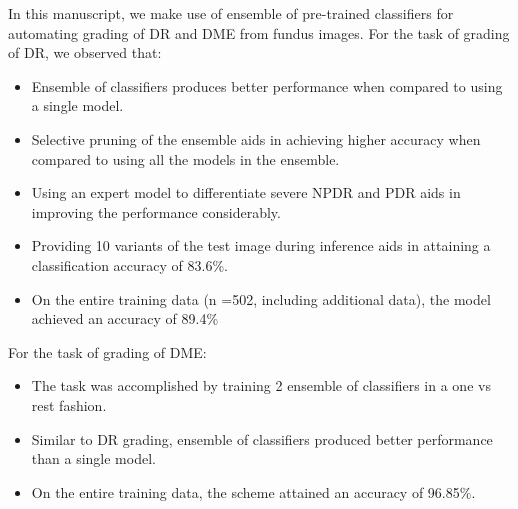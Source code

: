 \documentclass{paper}
\begin{document}
In this manuscript, we make use of ensemble of pre-trained classifiers for automating grading of DR and DME from fundus images. For the task of grading of DR, we observed that:
\begin{itemize}
\item Ensemble of classifiers produces better performance when compared to using a single model.
\item Selective pruning of the ensemble aids in achieving higher accuracy when compared to using all the models in the ensemble.
\item Using an expert model to differentiate severe NPDR and PDR aids in improving the performance considerably.
\item Providing 10 variants of the test image during inference aids in attaining a classification accuracy of 83.6\%.
\item On the entire training data (n =502, including additional data), the model achieved an accuracy of 89.4\%
\end{itemize}
For the task of grading of DME:
\begin{itemize}
\item The task was accomplished by training 2 ensemble of classifiers in a one vs rest fashion.
\item Similar to DR grading, ensemble of classifiers produced better performance than a single model.
\item On the entire training data, the scheme attained an accuracy of 96.85\%.
\end{itemize}



\end{document}
